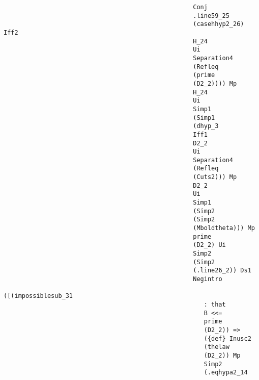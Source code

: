 \documentclass[12pt]{article}
\begin{document}
\begin{verbatim}
                                                    Conj 
                                                    .line59_25 
                                                    (casehhyp2_26) Iff2 
                                                    H_24 
                                                    Ui 
                                                    Separation4 
                                                    (Refleq 
                                                    (prime 
                                                    (D2_2)))) Mp 
                                                    H_24 
                                                    Ui 
                                                    Simp1 
                                                    (Simp1 
                                                    (dhyp_3 
                                                    Iff1 
                                                    D2_2 
                                                    Ui 
                                                    Separation4 
                                                    (Refleq 
                                                    (Cuts2))) Mp 
                                                    D2_2 
                                                    Ui 
                                                    Simp1 
                                                    (Simp2 
                                                    (Simp2 
                                                    (Mboldtheta))) Mp 
                                                    prime 
                                                    (D2_2) Ui 
                                                    Simp2 
                                                    (Simp2 
                                                    (.line26_2)) Ds1 
                                                    Negintro 
                                                    ([(impossiblesub_31 
                                                       : that 
                                                       B <<= 
                                                       prime 
                                                       (D2_2)) => 
                                                       ({def} Inusc2 
                                                       (thelaw 
                                                       (D2_2)) Mp 
                                                       Simp2 
                                                       (.eqhypa2_14 

\end{verbatim}
\end{document}
